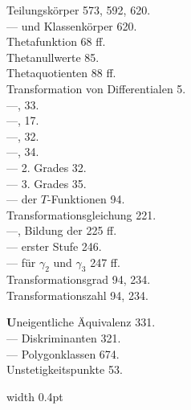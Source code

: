 
\noindent
\begin{minipage}[t]{0.48\textwidth}
\noindent Teilungskörper 573, 592, 620.\\
--- und Klassenkörper 620.\\
Thetafunktion 68 ff.\\
Thetanullwerte 85.\\
Thetaquotienten 88 ff.\\
Transformation von Differentialen 5.\\
---,  33.\\
---,  17.\\
---,  32.\\
---,  34.\\
--- 2. Grades 32.\\
--- 3. Grades 35.\\
--- der $T$-Funktionen 94.\\
Transformationsgleichung 221.\\
---, Bildung der 225 ff.\\
--- erster Stufe 246.\\
--- für $\gamma_2$ und $\gamma_3$ 247 ff.\\
Transformationsgrad 94, 234.\\
Transformationszahl 94, 234.

\noindent \textbf{U}neigentliche Äquivalenz 331.\\
--- Diskriminanten 321.\\
--- Polygonklassen 674.\\
Unstetigkeitspunkte 53.
\end{minipage}%
\hfill\vrule width 0.4pt\hfill

